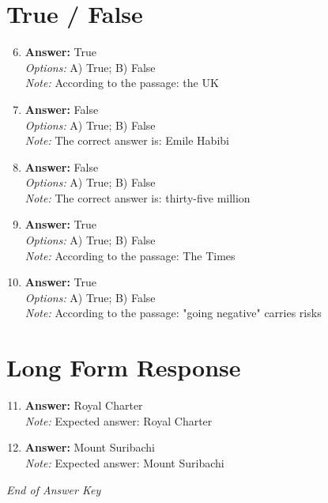 \documentclass[12pt]{article}
\begin{document}
\section*{True / False}
\begin{enumerate}[label=\arabic*.]
\setcounter{enumi}{5}
\item \textbf{Answer:} True
\\ \textit{Options:} A) True; B) False
\\ \textit{Note:} According to the passage: the UK
\item \textbf{Answer:} False
\\ \textit{Options:} A) True; B) False
\\ \textit{Note:} The correct answer is: Emile Habibi
\item \textbf{Answer:} False
\\ \textit{Options:} A) True; B) False
\\ \textit{Note:} The correct answer is: thirty-five million
\item \textbf{Answer:} True
\\ \textit{Options:} A) True; B) False
\\ \textit{Note:} According to the passage: The Times
\item \textbf{Answer:} True
\\ \textit{Options:} A) True; B) False
\\ \textit{Note:} According to the passage: "going negative" carries risks
\end{enumerate}

\section*{Long Form Response}
\begin{enumerate}[label=\arabic*.]
\setcounter{enumi}{10}
\item \textbf{Answer:} Royal Charter
\\ \textit{Note:} Expected answer: Royal Charter
\item \textbf{Answer:} Mount Suribachi
\\ \textit{Note:} Expected answer: Mount Suribachi
\end{enumerate}

\vfill
\noindent\textit{End of Answer Key}
\end{document}
